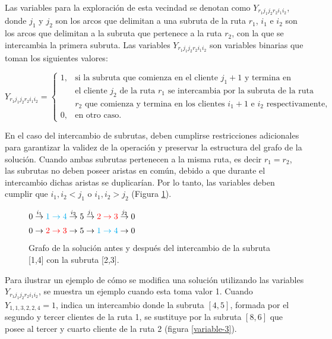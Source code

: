 \documentclass[12pt]{report}
\begin{document}
	Las variables para la exploración de esta vecindad se denotan como $Y_{r_1j_1j_2r_2i_1i_2}$, donde $j_1$ y $j_2$ son los arcos que delimitan a una subruta de la ruta $r_1$, $i_1$ e $i_2$ son los arcos que delimitan a la subruta que pertenece a la ruta $r_2$, con la que se intercambia la primera subruta. Las variables $Y_{r_1j_1j_2r_2i_1i_2}$ son variables binarias que toman los siguientes valores:


        \[
        Y_{r_1 j_1 j_2 r_2 i_1 i_2} =
        \begin{cases}
        	1,  & \text{si la subruta que comienza en el cliente $j_1+1$ y termina en }\\
        		& \text{el cliente $j_2$ de la ruta $r_1$ se intercambia por la subruta de la ruta}\\
        		& \text{$r_2$ que comienza y termina en los clientes $i_1+1$ e $i_2$ respectivamente,}\\
        	0,	& \text{en otro caso.}
        \end{cases}
        \]

	En el caso del intercambio de subrutas, deben cumplirse restricciones adicionales para garantizar la validez de la operación y preservar la estructura del grafo de la solución. Cuando ambas subrutas pertenecen a la misma ruta, es decir $r_1 = r_2$, las subrutas no deben poseer aristas en común, debido a que durante el intercambio dichas aristas se duplicarían. Por lo tanto, las variables deben cumplir que $i_1,i_2 < j_1$ o $i_1,i_2 > j_2$ (Figura \ref{fig:grafo-efecto}).

	\begin{figure}[h!]
		\begin{minipage}{0.45\textwidth}
			\centering
			$ 0 \overset{i_1}{\rightarrow} \textcolor{cyan}{1 \rightarrow 4} \overset{i_2}{\rightarrow} 5 \overset{j_1}{\rightarrow} \textcolor{red}{2 \rightarrow 3} \overset{j_2}{\rightarrow} 0$\\
		\end{minipage}
		\hfill
		\begin{minipage}{0.45\textwidth}
			\centering
			$0 \rightarrow \textcolor{red}{2 \rightarrow 3} \rightarrow 5 \rightarrow\textcolor{cyan}{1 \rightarrow 4} \rightarrow 0$
		\end{minipage}
		\caption{Grafo de la solución antes y después del intercambio de la subruta [1,4] con la subruta [2,3].}
		\label{fig:grafo-efecto}
	\end{figure}

	Para ilustrar un ejemplo de cómo se modifica una solución utilizando las variables $Y_{r_1 j_1 j_2 r_2 i_1 i_2}$, se muestra un ejemplo cuando esta toma valor 1. Cuando $Y_{1,1,3,2,2,4}=1$, indica un intercambio donde la subruta \([4,5]\), formada por el segundo y tercer clientes de la ruta 1, se sustituye por la subruta \([8,6]\) que posee al tercer y cuarto cliente de la ruta 2 (figura \ref{variable-3}).
\end{document}
